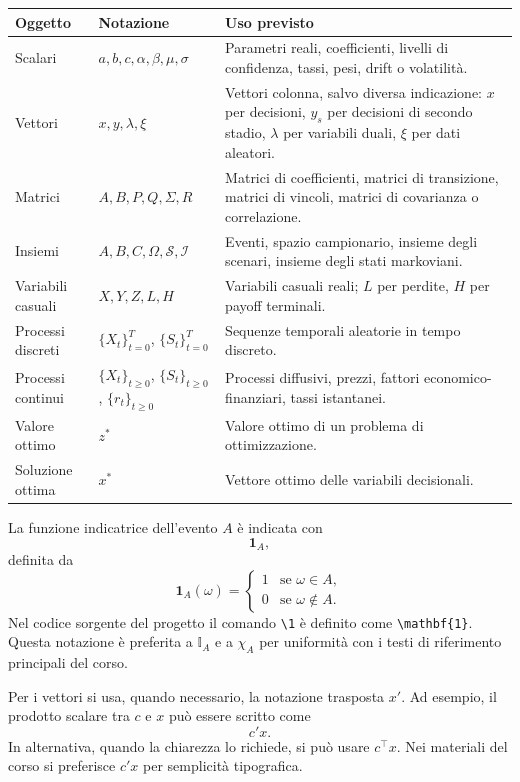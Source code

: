 \documentclass[12pt,a4paper]{article}
\newcommand{\1}{\mathbf{1}}
\begin{document}
\begin{longtable}{>{\raggedright}p{3.2cm}>{\raggedright}p{4.2cm}>{\raggedright\arraybackslash}p{7.0cm}}
\hline
\textbf{Oggetto} & \textbf{Notazione} & \textbf{Uso previsto}\\
\hline
Scalari & $a,b,c,\alpha,\beta,\mu,\sigma$ & Parametri reali, coefficienti, livelli di confidenza, tassi, pesi, drift o volatilit\`a.\\
Vettori & $x,y,\lambda,\xi$ & Vettori colonna, salvo diversa indicazione: $x$ per decisioni, $y_s$ per decisioni di secondo stadio, $\lambda$ per variabili duali, $\xi$ per dati aleatori.\\
Matrici & $A,B,P,Q,\Sigma,R$ & Matrici di coefficienti, matrici di transizione, matrici di vincoli, matrici di covarianza o correlazione.\\
Insiemi & $A,B,C,\Omega,\mathcal{S},\mathcal{I}$ & Eventi, spazio campionario, insieme degli scenari, insieme degli stati markoviani.\\
Variabili casuali & $X,Y,Z,L,H$ & Variabili casuali reali; $L$ per perdite, $H$ per payoff terminali.\\
Processi discreti & $\{X_t\}_{t=0}^{T}$, $\{S_t\}_{t=0}^{T}$ & Sequenze temporali aleatorie in tempo discreto.\\
Processi continui & $\{X_t\}_{t\geq0}$, $\{S_t\}_{t\geq0}$, $\{r_t\}_{t\geq0}$ & Processi diffusivi, prezzi, fattori economico-finanziari, tassi istantanei.\\
Valore ottimo & $z^*$ & Valore ottimo di un problema di ottimizzazione.\\
Soluzione ottima & $x^*$ & Vettore ottimo delle variabili decisionali.\\
\hline
\end{longtable}

La funzione indicatrice dell'evento $A$ \`e indicata con
\[
\1_A,
\]
definita da
\[
\1_A(\omega)=
\begin{cases}
1 & \text{se }\omega\in A,\\
0 & \text{se }\omega\notin A.
\end{cases}
\]
Nel codice sorgente del progetto il comando \verb|\1| \`e definito come
\verb|\mathbf{1}|. Questa notazione \`e preferita a $\mathbb{I}_A$ e a
$\chi_A$ per uniformit\`a con i testi di riferimento principali del corso.

Per i vettori si usa, quando necessario, la notazione trasposta $x'$. Ad
esempio, il prodotto scalare tra $c$ e $x$ pu\`o essere scritto come
\[
 c'x.
\]
In alternativa, quando la chiarezza lo richiede, si pu\`o usare
$c^{\top}x$. Nei materiali del corso si preferisce $c'x$ per semplicit\`a
tipografica.
\end{document}
